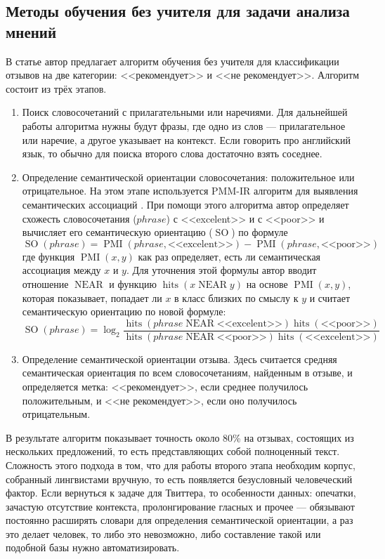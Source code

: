 \subsection{Методы обучения без учителя для задачи анализа мнений}
В статье \cite{pang2002thumbs} автор предлагает алгоритм обучения без учителя для классификации
отзывов на две категории: <<рекомендует>> и <<не рекомендует>>. Алгоритм состоит из трёх
этапов.
\begin{enumerate}
\item Поиск словосочетаний с прилагательными или наречиями. Для дальнейшей работы алгоритма нужны
  будут фразы, где одно из слов --- прилагательное или наречие, а другое указывает на контекст. Если
  говорить про английский язык, то обычно для поиска второго слова достаточно взять соседнее.
\item Определение семантической ориентации словосочетания: положительное или отрицательное. На этом
  этапе используется PMM-IR алгоритм для выявления семантических ассоциаций
  \cite{Church:1989:PWA:1075434.1075449}. При помощи этого алгоритма автор определяет схожесть словосочетания ($phrase$)
  с <<excelent>> и с <<poor>> и вычисляет его семантическую ориентацию ($\operatorname{SO}$) по формуле
\begin{equation}
  \operatorname{SO}(phrase) = \operatorname{PMI}(phrase, \textrm{<<excelent>>}) -
  \operatorname{PMI}(phrase, \textrm{<<poor>>})
\end{equation}
где функция $\operatorname{PMI}(x,y)$ как раз определяет, есть ли семантическая ассоциация между $x$ и $y$. Для уточнения этой
формулы автор вводит отношение $\operatorname{NEAR}$ и функцию $\operatorname{hits}(x
\operatorname{NEAR} y)$ на основе $\operatorname{PMI}(x,y)$, которая показывает, попадает ли
$x$ в класс близких по смыслу к $y$ и считает семантическую ориентацию  по новой формуле:
\begin{equation}
\operatorname{SO}(phrase)
= \log_2 \frac
          {\operatorname{hits}(phrase \operatorname{NEAR} \textrm{<<excelent>>}) \operatorname{hits}(\textrm{<<poor>>})}
          {\operatorname{hits}(phrase \operatorname{NEAR} \textrm{<<poor>>}) \operatorname{hits}(\textrm{<<excelent>>})}
\end{equation}
\item Определение семантической ориентации отзыва. Здесь считается средняя семантическая ориентация
  по всем словосочетаниям, найденным в отзыве, и определяется метка: <<рекомендует>>, если среднее
  получилось положительным, и <<не рекомендует>>, если оно получилось отрицательным.
\end{enumerate}
В результате алгоритм показывает точность около 80\% на отзывах, состоящих из нескольких
предложений, то есть представляющих собой полноценный текст. Сложность этого подхода в том, что для
работы второго этапа необходим корпус, собранный лингвистами вручную, то есть появляется безусловный
человеческий фактор. Если вернуться к задаче для Твиттера, то особенности данных: опечатки,
зачастую отсутствие контекста, пролонгирование гласных и прочее --- обязывают постоянно расширять
словари для определения семантической ориентации, а раз это делает человек, то либо это невозможно,
либо составление такой или подобной базы нужно автоматизировать.


